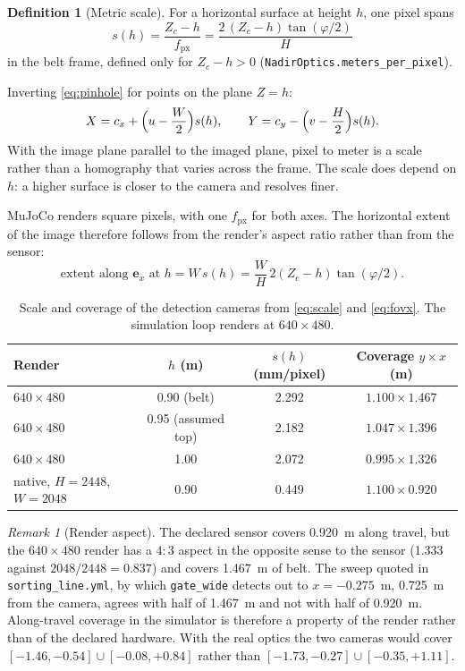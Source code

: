 \documentclass[11pt,a4paper]{article}
\theoremstyle{definition}
\newtheorem{definition}{Definition}
\theoremstyle{remark}
\newtheorem{remark}{Remark}
\newcommand{\ex}{\mathbf{e}_x}
\newcommand{\code}[1]{\texttt{#1}}
\begin{document}
\begin{definition}[Metric scale]
For a horizontal surface at height $h$, one pixel spans
\begin{equation}
\label{eq:scale}
s(h) = \frac{Z_c - h}{f_{\text{px}}} = \frac{2\,(Z_c - h)\tan(\varphi/2)}{H}
\end{equation}
in the belt frame, defined only for $Z_c - h > 0$
(\code{NadirOptics.meters\_per\_pixel}).
\end{definition}

Inverting \eqref{eq:pinhole} for points on the plane $Z=h$:
\begin{equation}
\label{eq:backprojection}
X = c_x + \Bigl(u - \frac{W}{2}\Bigr) s(h),
\qquad
Y = c_y - \Bigl(v - \frac{H}{2}\Bigr) s(h).
\end{equation}
With the image plane parallel to the imaged plane, pixel to meter is a scale
rather than a homography that varies across the frame. The scale does depend on
$h$: a higher surface is closer to the camera and resolves finer.

MuJoCo renders square pixels, with one $f_{\text{px}}$ for both axes. The
horizontal extent of the image therefore follows from the render's aspect ratio
rather than from the sensor:
\begin{equation}
\label{eq:fovx}
\text{extent along } \ex \text{ at } h = W\,s(h) = \frac{W}{H}\,2(Z_c-h)\tan(\varphi/2).
\end{equation}

\begin{table}[ht]
\centering
\caption{Scale and coverage of the detection cameras from \eqref{eq:scale} and
\eqref{eq:fovx}. The simulation loop renders at $640\times480$.}
\label{tab:scale}
\begin{tabular}{@{}lccc@{}}
\toprule
Render & $h$ (m) & $s(h)$ (mm/pixel) & Coverage $y \times x$ (m) \\
\midrule
$640\times480$ & 0.90 (belt) & 2.292 & $1.100 \times 1.467$ \\
$640\times480$ & 0.95 (assumed top) & 2.182 & $1.047 \times 1.396$ \\
$640\times480$ & 1.00 & 2.072 & $0.995 \times 1.326$ \\
native, $H=2448$, $W=2048$ & 0.90 & 0.449 & $1.100 \times 0.920$ \\
\bottomrule
\end{tabular}
\end{table}

\begin{remark}[Render aspect]
\label{rem:aspect}
The declared sensor covers 0.920~m along travel, but the $640\times480$ render
has a $4{:}3$ aspect in the opposite sense to the sensor (1.333 against
$2048/2448 = 0.837$) and covers 1.467~m of belt. The sweep quoted in
\code{sorting\_line.yml}, by which \code{gate\_wide} detects out to
$x = -0.275$~m, 0.725~m from the camera, agrees with half of 1.467~m and not with
half of 0.920~m. Along-travel coverage in the simulator is therefore a property
of the render rather than of the declared hardware. With the real optics the
two cameras would cover $[-1.46, -0.54]\cup[-0.08, +0.84]$ rather than
$[-1.73, -0.27]\cup[-0.35, +1.11]$.
\end{remark}
\end{document}
